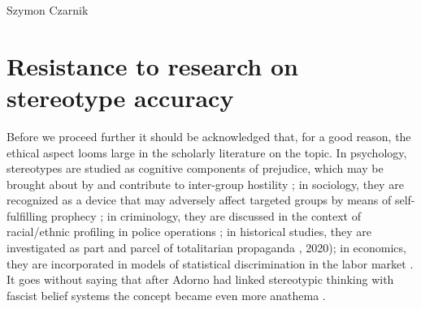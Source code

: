 \begin{artengenv}{Szymon Czarnik}
\section{Resistance to research on stereotype accuracy}
Before we proceed further it should be acknowledged that, for a good reason, the ethical aspect looms large in the scholarly literature on the topic. In psychology, stereotypes are studied as cognitive components of prejudice, which may be brought about by and contribute to inter-group hostility
\parencite[][]{bar-tal_delegitimization_1989}; %
 in sociology, they are recognized as a device that may adversely affect targeted groups by means of self-fulfilling prophecy 
\parencite[][]{merton_self-fulfilling_1948}; %
 in criminology, they are discussed in the context of racial/ethnic profiling in police operations 
\parencite[][]{schauer_profiles_2003}; %
 in historical studies, they are investigated as part and parcel of totalitarian propaganda 
\parencites[][]{werth_dekulakisation_2011}[][]{ushmm_united_states_holocaust_memorial_museum_defining_nodate}, %
 2020); in economics, they are incorporated in models of statistical discrimination in the labor market 
\parencites[][]{arrow_theory_1971}[][]{phelps_statistical_1972}. %
 It goes without saying that after Adorno had linked stereotypic thinking with fascist belief systems the concept became even more anathema 
\parencite[][]{jones_stereotypes_2001}.%



\end{artengenv}
